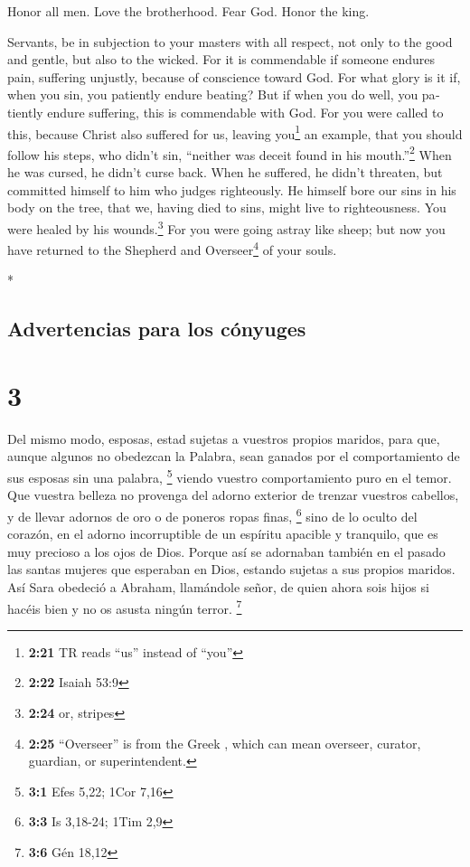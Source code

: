 \begin{paracol}{2}
\begin{otherlanguage}{english}
 Honor all men. Love the brotherhood. Fear God. Honor the
king.

 Servants, be in subjection to your masters with all
respect, not only to the good and gentle, but also to the wicked.
 For it is commendable if someone endures pain, suffering
unjustly, because of conscience toward God.  For what
glory is it if, when you sin, you patiently endure beating? But if when
you do well, you patiently endure suffering, this is commendable with
God.  For you were called to this, because Christ also
suffered for us, leaving you\footnote{\textbf{2:21} TR reads ``us''
  instead of ``you''} an example, that you should follow his steps,
 who didn't sin, ``neither was deceit found in his
mouth.''\footnote{\textbf{2:22} Isaiah 53:9}  When he was
cursed, he didn't curse back. When he suffered, he didn't threaten, but
committed himself to him who judges righteously.  He
himself bore our sins in his body on the tree, that we, having died to
sins, might live to righteousness. You were healed by his
wounds.\footnote{\textbf{2:24} or, stripes}  For you were
going astray like sheep; but now you have returned to the Shepherd and
Overseer\footnote{\textbf{2:25} ``Overseer'' is from the Greek
  , which can mean overseer, curator, guardian, or
  superintendent.} of your souls.

\end{otherlanguage}

\switchcolumn[0]*

\hypertarget{advertencias-para-los-cuxf3nyuges}{%
\subsection{Advertencias para los
cónyuges}\label{advertencias-para-los-cuxf3nyuges}}

\hypertarget{section-4}{%
\section{3}\label{section-4}}

 Del mismo modo, esposas, estad sujetas a vuestros propios
maridos, para que, aunque algunos no obedezcan la Palabra, sean ganados
por el comportamiento de sus esposas sin una palabra, \footnote{\textbf{3:1}
  Efes 5,22; 1Cor 7,16}  viendo vuestro comportamiento
puro en el temor.  Que vuestra belleza no provenga del
adorno exterior de trenzar vuestros cabellos, y de llevar adornos de oro
o de poneros ropas finas, \footnote{\textbf{3:3} Is 3,18-24; 1Tim 2,9}
 sino de lo oculto del corazón, en el adorno incorruptible
de un espíritu apacible y tranquilo, que es muy precioso a los ojos de
Dios.  Porque así se adornaban también en el pasado las
santas mujeres que esperaban en Dios, estando sujetas a sus propios
maridos.  Así Sara obedeció a Abraham, llamándole señor,
de quien ahora sois hijos si hacéis bien y no os asusta ningún terror.
\footnote{\textbf{3:6} Gén 18,12}


\end{paracol}
